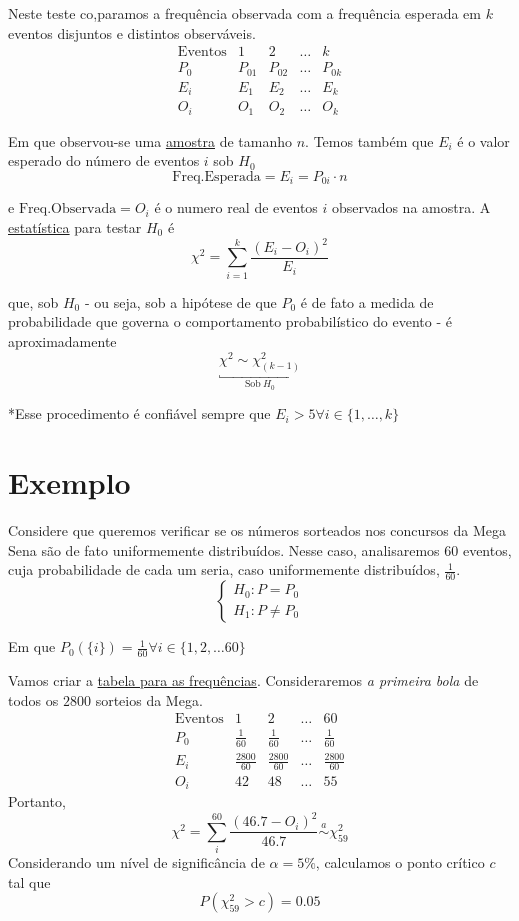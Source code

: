 \documentclass[
  letterpaper,
  DIV=11,
  numbers=noendperiod]{scrreprt}
\begin{document}
Neste teste co,paramos a frequência observada com a frequência esperada
em \(k\) eventos disjuntos e distintos observáveis. \[
\begin{array}{c|cc}
\text{Eventos}  & 1  & 2 & \dots & k \\
\hline
P_{0} & P_{01} & P_{02} & \dots & P_{0k} \\
E_{i}  & E_{1} & E_{2} & \dots & E_{k} \\
O_{i} & O_{1} & O_{2} & \dots & O_{k}
\end{array}
\]

Em que observou-se uma \hyperref[sec-ao]{amostra} de tamanho \(n\).
Temos também que \(E_{i}\) é o valor esperado do número de eventos \(i\)
sob \(H_{0}\) \[
\mathrm{Freq. Esperada} = E_{i} = P_{0i} \cdot n
\]

e \(\mathrm{Freq. Observada} = O_{i}\) é o numero real de eventos \(i\)
observados na amostra. A \href{estatisticas.qmd}{estatística} para
testar \(H_{0}\) é \[
\chi^2 = \sum^k_{i=1} \frac{(E_{i}-O_{i})^2}{E_{i}}
\]

que, sob \(H_0\) - ou seja, sob a hipótese de que \(P_{0}\) é de fato a
medida de probabilidade que governa o comportamento probabilístico do
evento - é aproximadamente \[
\underbracket{\chi^2 \sim \chi^2_{(k-1)}}_{\mathrm{Sob}~H_{0}}
\]

*Esse procedimento é confiável sempre que
\(E_{i}>5 \forall i \in \{ 1,\dots,k \}\)

\section{Exemplo}\label{exemplo-9}

Considere que queremos verificar se os números sorteados nos concursos
da Mega Sena são de fato uniformemente distribuídos. Nesse caso,
analisaremos 60 eventos, cuja probabilidade de cada um seria, caso
uniformemente distribuídos, \(\frac{1}{60}\). \[
\begin{cases}
H_{0}: P = P_{0} \\
H_{1}: P \neq P_{0}
\end{cases}
\]

Em que
\(P_{0}(\{ i \}) = \frac{1}{60} \forall i \in \{ 1,2,\dots 60 \}\)

Vamos criar a \href{tabela-frequencias.qmd}{tabela para as frequências}.
Consideraremos \emph{a primeira bola} de todos os \(2800\) sorteios da
Mega. \[
\begin{array}{c|ccc}
\mathrm{Eventos}  &  1 & 2 & \dots & 60\\
\hline
P_{0} & \frac{1}{60} & \frac{1}{60} & \dots & \frac{1}{60} \\
E_{i} & \frac{2800}{60}  & \frac{2800}{60}  & \dots  & \frac{2800}{60} \\
O_{i} & 42 & 48 & \dots  & 55 
\end{array}
\] Portanto, \[
\chi^2 = \sum^{60}_{i} \frac{(46.7 - O_{i})^2}{46.7} \stackrel{a}{\sim} \chi^2_{59}
\] Considerando um nível de significância de \(\alpha=5\%\), calculamos
o ponto crítico \(c\) tal que \[
P(\chi^2_{59}>c) = 0.05
\]
\end{document}
